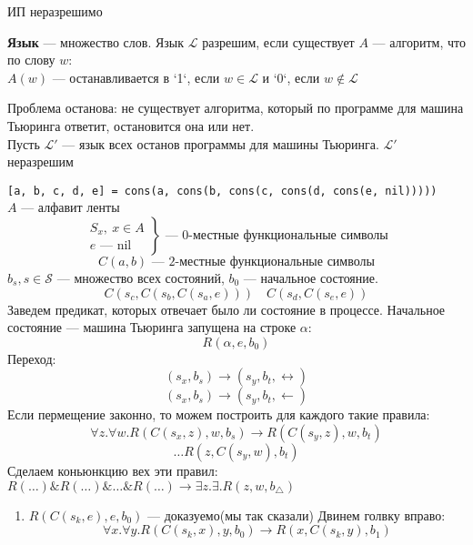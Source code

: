 \documentclass[oneside]{book}
\begin{document}
\begin{theorem}
	ИП неразрешимо
	\label{orgc212843}
\end{theorem}
\begin{definition}
	\textbf{Язык} --- множество слов. Язык \(\mathcal{L}\) разрешим, если существует \(A\) --- алгоритм, что по слову \(w\): \\
	\(A(w)\) --- останавливается в `1`, если \(w \in \mathcal{L}\) и `0`, если \(w \not\in \mathcal{L}\)
	\label{org2a89a51}
\end{definition}
\begin{remark}
	Проблема останова: не существует алгоритма, который по программе для машина Тьюринга ответит, остановится она или нет. \\
	Пусть \(\mathcal{L}'\) --- язык всех останов программы для машины Тьюринга. \(\mathcal{L}'\) неразрешим
	\label{org81fc982}
\end{remark}
\begin{remark}
	\texttt{[a, b, c, d, e] = cons(a, cons(b, cons(c, cons(d, cons(e, nil)))))} \\
	\(A\) --- алфавит ленты
	\[ \left.\begin{array}{l}
			S_x,\ x \in A \\
			e \text{ --- } \text{nil}
		\end{array}\right\} \text{ --- } 0\text{-местные функциональные символы}\]
	\[ C(a, b) \text{ --- } 2\text{-местные функциональные символы} \]
	\(b_s, s \in \mathcal{S}\) --- множество всех состояний, \(b_0\) --- начальное состояние.
	\[ C(s_c, C(s_b, C(s_a, e))) \quad C(s_d, C(s_e, e)) \]
	Заведем предикат, которых отвечает было ли состояние в процессе. Начальное состояние --- машина Тьюринга запущена на строке \(\alpha\):
	\[ R(\alpha, e, b_0) \]
	Переход:
	\[ (s_x, b_s) \to (s_y, b_t, \leftrightarrow) \]
	\[ (s_x, b_s) \to (s_y, b_t, \leftarrow) \]
	Если пермещение законно, то можем построить для каждого такие правила:
	\[ \forall z. \forall w. R(C(s_x, z), w, b_s) \to R(C(s_y, z), w, b_t) \]
	\[ \dots  R(z, C(s_y, w), b_t)\]
	Сделаем коньюнкцию вех эти правил: \(R(\dots)\&R(\dots)\&\dots\&R(\dots) \to \exists z. \exists . R(z, w, b_\triangle)\)
	\fixme
\end{remark}
\begin{examp}
	\-
	\begin{enumerate}
		\item \(R(C(s_k, e), e, b_0)\) --- доказуемо(мы так сказали)
		      Двинем голвку вправо:
		      \[ \forall x. \forall y. R(C(s_k, x), y, b_0) \to R(x, C(s_k, y), b_1) \]
	\end{enumerate}
\end{examp}
\end{document}
